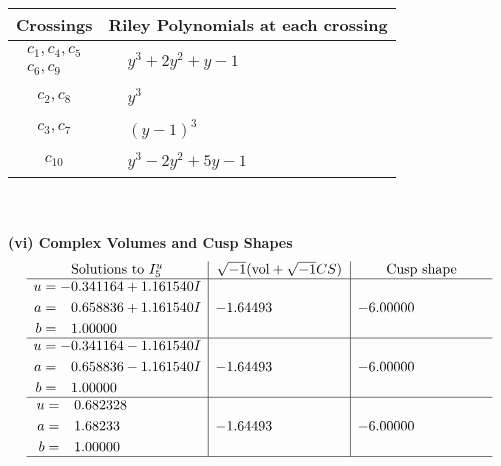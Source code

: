 \documentclass[1p]{elsarticle_modified}
\theoremstyle{definition}
\newcommand{\I}{\sqrt{-1}}
\begin{document}
\begin{tabular}{m{50pt}|m{274pt}}
Crossings & \hspace{64pt}Riley Polynomials at each crossing \\
\hline $$\begin{aligned}c_{1},c_{4},c_{5}\\c_{6},c_{9}\end{aligned}$$&$\begin{aligned}
&y^3+2 y^2+y-1
\end{aligned}$\\
\hline $$\begin{aligned}c_{2},c_{8}\end{aligned}$$&$\begin{aligned}
&y^3
\end{aligned}$\\
\hline $$\begin{aligned}c_{3},c_{7}\end{aligned}$$&$\begin{aligned}
&(y-1)^3
\end{aligned}$\\
\hline $$\begin{aligned}c_{10}\end{aligned}$$&$\begin{aligned}
&y^3-2 y^2+5 y-1
\end{aligned}$\\
\hline
\end{tabular}\\~\\
\newpage\flushleft \textbf{(vi) Complex Volumes and Cusp Shapes}
$$\begin{array}{c|c|c}  
\text{Solutions to }I^u_{5}& \I (\text{vol} + \sqrt{-1}CS) & \text{Cusp shape}\\
 \hline 
\begin{aligned}
u &= -0.341164 + 1.161540 I \\
a &= \phantom{-}0.658836 + 1.161540 I \\
b &= \phantom{-}1.00000\phantom{ +0.000000I}\end{aligned}
 & -1.64493\phantom{ +0.000000I} & -6.00000\phantom{ +0.000000I} \\ \hline\begin{aligned}
u &= -0.341164 - 1.161540 I \\
a &= \phantom{-}0.658836 - 1.161540 I \\
b &= \phantom{-}1.00000\phantom{ +0.000000I}\end{aligned}
 & -1.64493\phantom{ +0.000000I} & -6.00000\phantom{ +0.000000I} \\ \hline\begin{aligned}
u &= \phantom{-}0.682328\phantom{ +0.000000I} \\
a &= \phantom{-}1.68233\phantom{ +0.000000I} \\
b &= \phantom{-}1.00000\phantom{ +0.000000I}\end{aligned}
 & -1.64493\phantom{ +0.000000I} & -6.00000\phantom{ +0.000000I}\\
 \hline 
 \end{array}$$\newpage\newpage\renewcommand{\arraystretch}{1}
\end{document}
